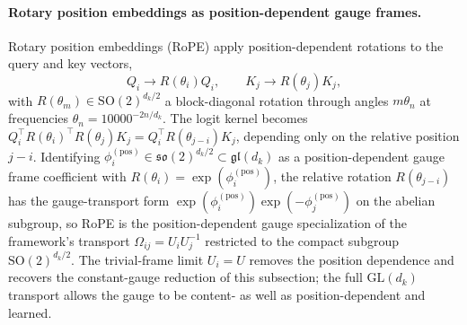 \documentclass[11pt]{article}
\begin{document}
\paragraph{Rotary position embeddings as position-dependent gauge frames.}
Rotary position embeddings (RoPE) \citep{su2024roformer} apply position-dependent rotations to the query and key vectors,
\begin{equation}
Q_i \to R(\theta_i) Q_i, \qquad K_j \to R(\theta_j) K_j,
\label{eq:rope_apply}
\end{equation}
with $R(\theta_m) \in \mathrm{SO}(2)^{d_k/2}$ a block-diagonal rotation through angles $m\theta_n$ at frequencies $\theta_n = 10000^{-2n/d_k}$. The logit kernel becomes $Q_i^\top R(\theta_i)^\top R(\theta_j) K_j = Q_i^\top R(\theta_{j-i}) K_j$, depending only on the relative position $j - i$. Identifying $\phi_i^{(\mathrm{pos})} \in \mathfrak{so}(2)^{d_k/2} \subset \mathfrak{gl}(d_k)$ as a position-dependent gauge frame coefficient with $R(\theta_i) = \exp(\phi_i^{(\mathrm{pos})})$, the relative rotation $R(\theta_{j-i})$ has the gauge-transport form $\exp(\phi_i^{(\mathrm{pos})})\exp(-\phi_j^{(\mathrm{pos})})$ on the abelian subgroup, so RoPE is the position-dependent gauge specialization of the framework's transport $\Omega_{ij} = U_iU_j^{-1}$ restricted to the compact subgroup $\mathrm{SO}(2)^{d_k/2}$. The trivial-frame limit $U_i = U$ removes the position dependence and recovers the constant-gauge reduction of this subsection; the full $\mathrm{GL}(d_k)$ transport allows the gauge to be content- as well as position-dependent and learned.
\end{document}
